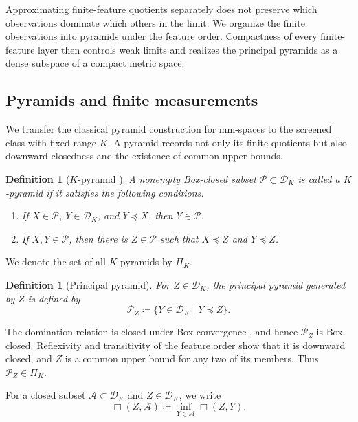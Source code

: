 \documentclass[10pt,a4paper]{amsart}
\newtheorem{definition}[theorem]{Definition}
\newcommand{\DK}{\mathcal D_K}
\begin{document}
Approximating finite-feature quotients separately does not preserve which observations dominate which others in the limit. We organize the finite observations into pyramids under the feature order. Compactness of every finite-feature layer then controls weak limits and realizes the principal pyramids as a dense subspace of a compact metric space.

\subsection{Pyramids and finite measurements}
\label{subsec:pyramid-measurements}

We transfer the classical pyramid construction for mm-spaces to the screened class with fixed range $K$. A pyramid records not only its finite quotients but also downward closedness and the existence of common upper bounds.

\begin{definition}[$K$-pyramid {\cite[Definitions~6.3--6.4]{shioya2016mmg}}]
\label{def:K-pyramid}
A nonempty Box-closed subset $\mathcal P\subset\DK$ is called a \emph{$K$-pyramid} if it satisfies the following conditions.
\begin{enumerate}
\item If $X\in\mathcal P$, $Y\in\DK$, and $Y\preceq X$, then $Y\in\mathcal P$.
\item If $X,Y\in\mathcal P$, then there is $Z\in\mathcal P$ such that $X\preceq Z$ and $Y\preceq Z$.
\end{enumerate}
\end{definition}

We denote the set of all $K$-pyramids by $\Pi_K$.

\begin{definition}[Principal pyramid]
\label{def:principal-pyramid}
For $Z\in\DK$, the \emph{principal pyramid} generated by $Z$ is defined by
\[
\mathcal P_Z\coloneqq\{Y\in\DK\mid Y\preceq Z\}.
\]
\end{definition}

The domination relation is closed under Box convergence \cite[Theorem~4.16]{gds1}, and hence $\mathcal P_Z$ is Box closed. Reflexivity and transitivity of the feature order show that it is downward closed, and $Z$ is a common upper bound for any two of its members. Thus $\mathcal P_Z\in\Pi_K$.

For a closed subset $\mathcal A\subset\DK$ and $Z\in\DK$, we write
\[
\Box(Z,\mathcal A)\coloneqq\inf_{Y\in\mathcal A}\Box(Z,Y).
\]
\end{document}
